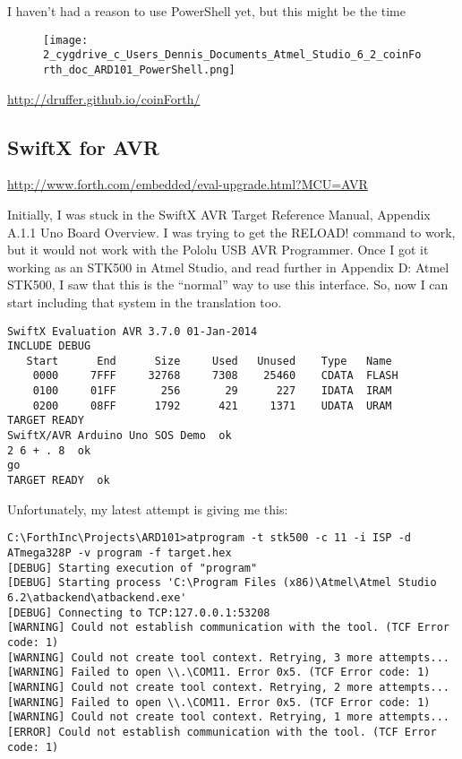 \documentclass[10pt,english]{article}
\begin{document}
I haven't had a reason to use PowerShell yet, but this might be the
time

\begin{figure}
\caption{\protect\texttt{[image: 2\_cygdrive\_c\_Users\_Dennis\_Documents\_Atmel\_Studio\_6\_2\_coinForth\_doc\_ARD101\_PowerShell.png]}}
\end{figure}


\url{http://druffer.github.io/coinForth/}


\subsection{SwiftX for AVR}

\url{http://www.forth.com/embedded/eval-upgrade.html?MCU=AVR}

Initially, I was stuck in the SwiftX AVR Target Reference Manual,
Appendix A.1.1 Uno Board Overview. I was trying to get the RELOAD!
command to work, but it would not work with the Pololu USB AVR Programmer.
Once I got it working as an STK500 in Atmel Studio, and read further
in Appendix D: Atmel STK500, I saw that this is the ``normal'' way
to use this interface. So, now I can start including that system in
the translation too.

\begin{lstlisting}
SwiftX Evaluation AVR 3.7.0 01-Jan-2014
INCLUDE DEBUG
   Start      End      Size     Used   Unused    Type   Name
    0000     7FFF     32768     7308    25460    CDATA  FLASH
    0100     01FF       256       29      227    IDATA  IRAM
    0200     08FF      1792      421     1371    UDATA  URAM
TARGET READY
SwiftX/AVR Arduino Uno SOS Demo  ok
2 6 + . 8  ok
go
TARGET READY  ok
\end{lstlisting}


Unfortunately, my latest attempt is giving me this:

\begin{lstlisting}
C:\ForthInc\Projects\ARD101>atprogram -t stk500 -c 11 -i ISP -d ATmega328P -v program -f target.hex
[DEBUG] Starting execution of "program"
[DEBUG] Starting process 'C:\Program Files (x86)\Atmel\Atmel Studio 6.2\atbackend\atbackend.exe'
[DEBUG] Connecting to TCP:127.0.0.1:53208
[WARNING] Could not establish communication with the tool. (TCF Error code: 1)
[WARNING] Could not create tool context. Retrying, 3 more attempts...
[WARNING] Failed to open \\.\COM11. Error 0x5. (TCF Error code: 1)
[WARNING] Could not create tool context. Retrying, 2 more attempts...
[WARNING] Failed to open \\.\COM11. Error 0x5. (TCF Error code: 1)
[WARNING] Could not create tool context. Retrying, 1 more attempts...
[ERROR] Could not establish communication with the tool. (TCF Error code: 1) 
\end{lstlisting}
\end{document}

